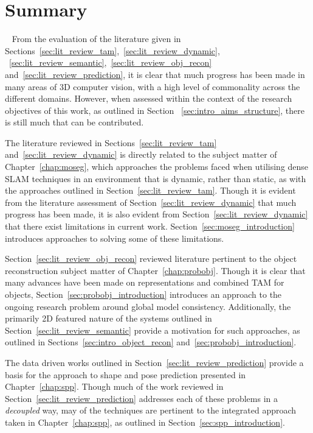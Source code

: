 \section{Summary}
~\label{sec:lit_review_summary}
From the evaluation of the literature given in Sections~\ref{sec:lit_review_tam},~\ref{sec:lit_review_dynamic},
~\ref{sec:lit_review_semantic},~\ref{sec:lit_review_obj_recon} and~\ref{sec:lit_review_prediction}, it is clear 
that much progress has been made in many areas of 3D computer vision, with a high level of commonality across the different 
domains. However, when assessed within the context of the research objectives of this work, as outlined in Section
~\ref{sec:intro_aims_structure}, there is still much that can be contributed.

The literature reviewed in Sections~\ref{sec:lit_review_tam} and~\ref{sec:lit_review_dynamic} is directly related to 
the subject matter of Chapter~\ref{chap:moseg}, which approaches the problems faced when utilising dense SLAM techniques 
in an environment that is dynamic, rather than static, as with the approaches outlined in Section~\ref{sec:lit_review_tam}.
Though it is evident from the literature assessment of Section~\ref{sec:lit_review_dynamic} that much progress has been made, 
it is also evident from Section~\ref{sec:lit_review_dynamic} that there exist limitations in current work. 
Section~\ref{sec:moseg_introduction} introduces approaches to solving some of these limitations.

Section~\ref{sec:lit_review_obj_recon} reviewed literature pertinent to the object reconstruction subject matter of 
Chapter~\ref{chap:probobj}. Though it is clear that many advances have been made on representations and combined TAM for 
objects, Section~\ref{sec:probobj_introduction} introduces an approach to the ongoing research problem around global model 
consistency. Additionally, the primarily 2D featured nature of the systems outlined in Section~\ref{sec:lit_review_semantic} 
provide a motivation for such approaches, as outlined in Sections~\ref{sec:intro_object_recon} and~\ref{sec:probobj_introduction}.

The data driven works outlined in Section~\ref{sec:lit_review_prediction} provide a basis for the approach to shape and pose 
prediction presented in Chapter~\ref{chap:spp}. Though much of the work reviewed in Section~\ref{sec:lit_review_prediction} 
addresses each of these problems in a \textit{decoupled} way, may of the techniques are pertinent to the integrated approach 
taken in Chapter~\ref{chap:spp}, as outlined in Section~\ref{sec:spp_introduction}.
